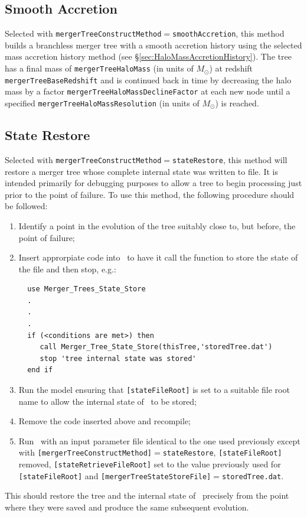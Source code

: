\subsection{Smooth Accretion}\label{sec:SmoothAccretion}

Selected with {\tt mergerTreeConstructMethod}$=${\tt smoothAccretion}, this method builds a branchless merger tree with a smooth accretion history using the selected mass accretion history method (see \S\ref{sec:HaloMassAccretionHistory}). The tree has a final mass of {\tt mergerTreeHaloMass} (in units of $M_\odot$) at redshift {\tt mergerTreeBaseRedshift} and is continued back in time by decreasing the halo mass by a factor {\tt mergerTreeHaloMassDeclineFactor} at each new \gls{node} until a specified {\tt mergerTreeHaloMassResolution} (in units of $M_\odot$) is reached.

\subsection{State Restore}\label{sec:TreeConstructStateRestore}

Selected with {\tt mergerTreeConstructMethod}$=${\tt stateRestore}, this method will restore a merger tree whose complete internal state was written to file. It is intended primarily for debugging purposes to allow a tree to begin processing just prior to the point of failure. To use this method, the following procedure should be followed:
\begin{enumerate}
 \item Identify a point in the evolution of the tree suitably close to, but before, the point of failure;
 \item Insert approrpiate code into \glc\ to have it call the function to store the state of the file and then stop, e.g.:
 \begin{verbatim}
  use Merger_Trees_State_Store
  .
  .
  .
  if (<conditions are met>) then
     call Merger_Tree_State_Store(thisTree,'storedTree.dat')
     stop 'tree internal state was stored'
  end if
 \end{verbatim}
 \item Run the model ensuring that {\tt [stateFileRoot]} is set to a suitable file root name to allow the internal state of \glc\ to be stored;
 \item Remove the code inserted above and recompile;
 \item Run \glc\ with an input parameter file identical to the one used previously except with {\tt [mergerTreeConstructMethod]}$=${\tt stateRestore}, {\tt [stateFileRoot]} removed, {\tt [stateRetrieveFileRoot]} set to the value previously used for {\tt [stateFileRoot]} and {\tt [mergerTreeStateStoreFile]}$=${\tt storedTree.dat}.
\end{enumerate}
This should restore the tree and the internal state of \glc\ precisely from the point where they were saved and produce the same subsequent evolution.

